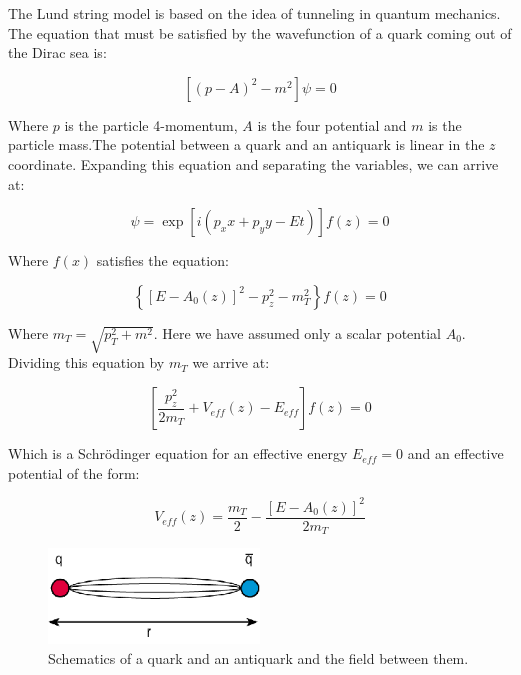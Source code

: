 
The Lund string model is based on the idea of tunneling in quantum mechanics. The equation that must be satisfied by the wavefunction of a quark coming out of the Dirac sea is\cite{wong_introduction_1994}:

\begin{equation}
\left[ (p-A)^2 -m^2 \right] \psi = 0
\end{equation}

Where $p$ is the particle 4-momentum, $A$ is the four potential and $m$ is the particle mass.The potential between a quark and an antiquark is linear in the $z$ coordinate. Expanding this equation and separating the variables, we can arrive at:

\begin{equation}
\psi = \exp [ i(p_x x + p_y y -Et) ] f(z) = 0
\end{equation}

Where $f(x)$ satisfies the equation:

\begin{equation}
\left\{ [E - A_0(z)]^2 - p_z^2 - m_T^2 \right\} f(z) = 0
\end{equation}

Where $m_T=\sqrt{p_T^2 + m^2}$. Here we have assumed only a scalar potential $A_0$\cite{wong_introduction_1994}. Dividing this equation by $m_T$ we arrive at:

\begin{equation}
\left[ \frac{p_z^2}{2m_T} + V_{eff}(z) - E_{eff} \right] f(z) = 0
\end{equation}

Which is a Schrödinger equation for an effective energy $E_{eff}=0$ and an effective potential of the form:

\begin{equation}
V_{eff}(z) = \frac{m_T}{2} - \frac{[ E-A_0(z) ]^2}{2 m_T}
\end{equation}

\begin{figure}
\includegraphics[width=0.5\textwidth]{images/lund.png}
\caption{Schematics of a quark and an antiquark and the field between them.}
\label{lund_scheme}
\end{figure}

